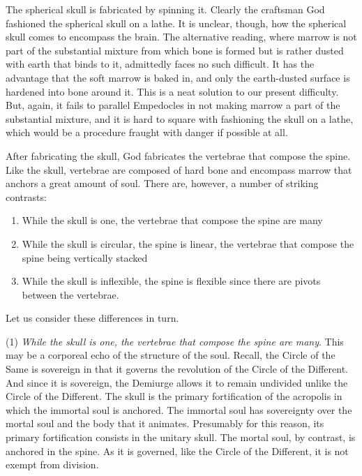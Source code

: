 The spherical skull is fabricated by spinning it. Clearly the craftsman God fashioned the spherical skull on a lathe. It is unclear, though, how the spherical skull comes to encompass the brain. The alternative reading, where marrow is not part of the substantial mixture from which bone is formed but is rather dusted with earth that binds to it, admittedly faces no such difficult. It has the advantage that the soft marrow is baked in, and only the earth-dusted surface is hardened into bone around it. This is a neat solution to our present difficulty. But, again, it fails to parallel Empedocles in not making marrow a part of the substantial mixture, and it is hard to square with fashioning the skull on a lathe, which would be a procedure fraught with danger if possible at all.

After fabricating the skull, God fabricates the vertebrae that compose the spine. Like the skull, vertebrae are composed of hard bone and encompass marrow that anchors a great amount of soul. There are, however, a number of striking contrasts:
\begin{enumerate}[(1)]
	\item While the skull is one, the vertebrae that compose the spine are many
	\item While the skull is circular, the spine is linear, the vertebrae that compose the spine being vertically stacked
	\item While the skull is inflexible, the spine is flexible since there are pivots between the vertebrae.
\end{enumerate}
Let us consider these differences in turn.

(1) \emph{While the skull is one, the vertebrae that compose the spine are many}. This may be a corporeal echo of the structure of the soul. Recall, the Circle of the Same is sovereign in that it governs the revolution of the Circle of the Different. And since it is sovereign, the Demiurge allows it to remain undivided unlike the Circle of the Different. The skull is the primary fortification of the acropolis in which the immortal soul is anchored. The immortal soul has sovereignty over the mortal soul and the body that it animates. Presumably for this reason, its primary fortification consists in the unitary skull. The mortal soul, by contrast, is anchored in the spine. As it is governed, like the Circle of the Different, it is not exempt from division.

